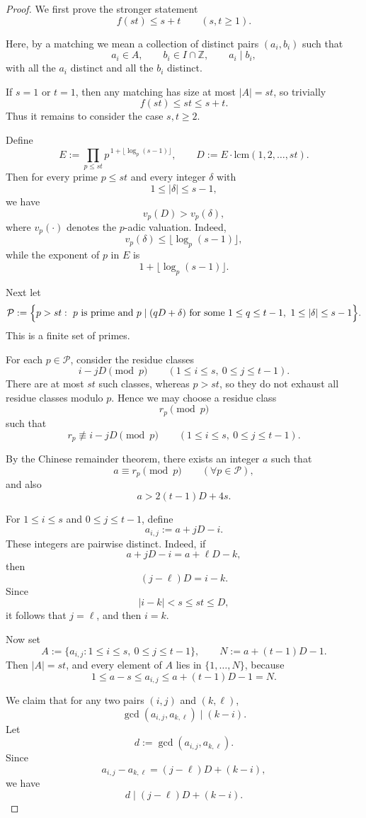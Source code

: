\documentclass[11pt,letterpaper,reqno]{amsart}
\theoremstyle{definition}
\numberwithin{equation}{section}
\begin{document}
\begin{proof}
We first prove the stronger statement
\[
f(st)\le s+t
\qquad (s,t\ge 1).
\]


Here, by a matching we mean a collection of distinct pairs $(a_i,b_i)$ such that
\[
a_i\in A,\qquad b_i\in I\cap \mathbb Z,\qquad a_i\mid b_i,
\]
with all the $a_i$ distinct and all the $b_i$ distinct.

If $s=1$ or $t=1$, then any matching has size at most $|A|=st$, so trivially
\[
f(st)\le st\le s+t.
\]
Thus it remains to consider the case $s,t\ge 2$.

Define
\[
E:=\prod_{p\le st} p^{\,1+\lfloor \log_p(s-1)\rfloor},
\qquad
D:=E\cdot \mathrm{lcm}(1,2,\dots,st).
\]
Then for every prime $p\le st$ and every integer $\delta$ with
\[
1\le |\delta|\le s-1,
\]
we have
\[
v_p(D)>v_p(\delta),
\]
where $v_p(\cdot)$ denotes the $p$-adic valuation. Indeed,
\[
v_p(\delta)\le \lfloor \log_p(s-1)\rfloor,
\]
while the exponent of $p$ in $E$ is
\[
1+\lfloor \log_p(s-1)\rfloor.
\]

Next let
\[
\mathcal P:=
\Bigl\{
p>st:\ p \text{ is prime and } p\mid (qD+\delta)
\text{ for some }1\le q\le t-1,\ 1\le |\delta|\le s-1
\Bigr\}.
\]
This is a finite set of primes.

For each $p\in\mathcal P$, consider the residue classes
\[
i-jD \pmod p
\qquad (1\le i\le s,\ 0\le j\le t-1).
\]
There are at most $st$ such classes, whereas $p>st$, so they do not exhaust all residue classes modulo $p$. Hence we may choose a residue class
\[
r_p \pmod p
\]
such that
\[
r_p\not\equiv i-jD\pmod p
\qquad (1\le i\le s,\ 0\le j\le t-1).
\]

By the Chinese remainder theorem, there exists an integer $a$ such that
\[
a\equiv r_p \pmod p
\qquad (\forall p\in\mathcal P),
\]
and also
\[
a>2(t-1)D+4s.
\]

For $1\le i\le s$ and $0\le j\le t-1$, define
\[
a_{i,j}:=a+jD-i.
\]
These integers are pairwise distinct. Indeed, if
\[
a+jD-i=a+\ell D-k,
\]
then
\[
(j-\ell)D=i-k.
\]
Since
\[
|i-k|<s\le st\le D,
\]
it follows that $j=\ell$, and then $i=k$.

Now set
\[
A:=\{a_{i,j}:1\le i\le s,\ 0\le j\le t-1\},
\qquad
N:=a+(t-1)D-1.
\]
Then $|A|=st$, and every element of $A$ lies in $\{1,\dots,N\}$, because
\[
1\le a-s\le a_{i,j}\le a+(t-1)D-1=N.
\]

We claim that for any two pairs $(i,j)$ and $(k,\ell)$,
\[
\gcd(a_{i,j},a_{k,\ell})\mid (k-i).
\]
Let
\[
d:=\gcd(a_{i,j},a_{k,\ell}).
\]
Since
\[
a_{i,j}-a_{k,\ell}=(j-\ell)D+(k-i),
\]
we have
\[
d\mid (j-\ell)D+(k-i).
\]


\end{proof}
\end{document}
